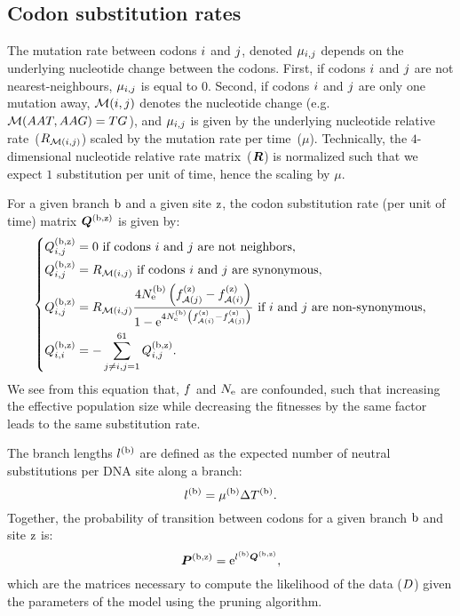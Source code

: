 \subsection{Codon substitution rates}

The mutation rate between codons ${i}$ and ${j}$, denoted $\mu_{{i}, {j}}$ depends on the underlying nucleotide change between the codons.
First, if codons ${i}$ and ${j}$ are not nearest-neighbours, $\mu_{{i}, {j}}$ is equal to $0$.
Second, if codons ${i}$ and ${j}$ are only one mutation away, $\mathcal{M}({i}, {j})$ denotes the nucleotide change (e.g.~$\mathcal{M}(AAT, AAG) = TG$), and $\mu_{{i}, {j}}$ is given by the underlying nucleotide relative rate~(${R_{\mathcal{M}({i}, {j})}}$) scaled by the mutation rate per time~($\mu$).
Technically, the $4$-dimensional nucleotide relative rate matrix~($\bm{R}$) is normalized such that we expect $1$ {substitution} per unit of time, hence the scaling by $\mu$.

For a given branch $\text{b}$ and a given site $\text{z}$, the {codon} {substitution} rate (per unit of time) matrix $\bm{Q}^{(\text{b}, \text{z})}$ is given by:
\begin{equation}
    \label{eq:subrates}
    \begin{dcases}
        \submatrix\branchsiteexp_{\itoj} = 0\text{ if codons $\ci$ and $\cj$ are not neighbors,} \\
        \submatrix\branchsiteexp_{\itoj} = \mutmatrix_{\nucitoj}\text{ if codons $\ci$ and $\cj$ are {synonymous},} \\
        \submatrix\branchsiteexp_{\itoj} = \mutmatrix_{\nucitoj} \dfrac{4\Ne\branchexp \left({\fitj\siteexp - \fiti\siteexp}\right)}{{1 - \e^{4\Ne\branchexp\left({\fiti\siteexp - \fitj\siteexp}\right)} }} \text{ if $\ci$ and $\cj$ are non-synonymous,}\\
        \submatrix\branchsiteexp_{\ci, \ci} = - \sum\limits_{ \cj \neq \ci, \cj=1}^{61} \submatrix\branchsiteexp_{\itoj}.
    \end{dcases}
\end{equation}
We see from this equation that, $f$ and $N_{\text{e}}$ are confounded, such that increasing the {effective population size} while decreasing the fitnesses by the same factor leads to the same {substitution} rate.

The branch lengths $l^{(\text{b})}$ are defined as the expected number of {neutral} substitutions per {DNA} site along a branch:
\begin{equation}
    \label{eq:branchlength}
    \branchlength\branchexp = \mu\branchexp \branchtime\branchexp.
\end{equation}
Together, the probability of transition between codons for a given branch $\text{b}$ and site $\text{z}$ is:
\begin{equation}
    \label{eq:Probmatrix}
    \Probmatrix\branchsiteexp = \e^{\branchlength\branchexp \Submatrix\branchsiteexp},
\end{equation}
which are the matrices necessary to compute the {likelihood} of the data ($D$) given the parameters of the model using the pruning algorithm.

